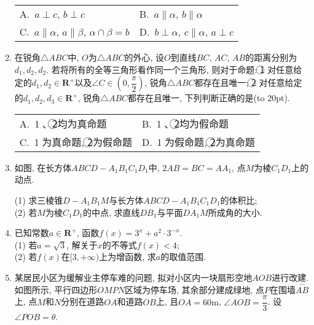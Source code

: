 \documentclass[10pt,a4paper]{article}
\newcommand{\bracket}[1]{(\hbox to #1pt{})}
\newcommand{\twoch}[4]{\par\begin{tabular}{p{.46\textwidth}p{.46\textwidth}}
A.~#1& B.~#2\\
C.~#3& D.~#4
\end{tabular}}
\begin{document}
\begin{enumerate}[1.]
\twoch{$a\perp c$, $b\perp c$}{$a\parallel \alpha$, $b\parallel \alpha$}{$a\parallel \alpha$, $a\parallel \beta$, $\alpha\cap \beta = b$}{$b\perp \alpha$, $c\parallel \alpha$, $a\perp c$}
\item 在锐角$\triangle ABC$中, $O$为$\triangle ABC$的外心, 设$O$到直线$BC$, $AC$, $AB$的距离分别为$d_1,d_2,d_2$. 若将所有的全等三角形看作同一个三角形, 则对于命题: \textcircled{1} 对任意给定的$d_1,d_2\in \mathbf{R}^+$以及$\angle C\in (0,\dfrac\pi 2)$, 锐角$\triangle ABC$都存在且唯一; \textcircled{2} 对任意给定的$d_1,d_2,d_3\in \mathbf{R}^+$, 锐角$\triangle ABC$都存在且唯一, 下列判断正确的是\bracket{20}.
\twoch{\textcircled{1}、\textcircled{2}均为真命题}{\textcircled{1}、\textcircled{2}均为假命题}{\textcircled{1}为真命题, \textcircled{2}为假命题}{\textcircled{1}为假命题, \textcircled{2}为真命题}
\item 如图, 在长方体$ABCD-A_1B_1C_1D_1$中, $2AB=BC=AA_1$, 点$M$为棱$C_1D_1$上的动点.
\begin{center}
\end{center}
(1) 求三棱锥$D-A_1B_1M$与长方体$ABCD-A_1B_1C_1D_1$的体积比;\\
(2) 若$M$为棱$C_1D_1$的中点, 求直线$DB_1$与平面$DA_1M$所成角的大小.
\item 已知常数$a\in \mathbf{R}^+$, 函数$f(x)=3^x+a^2\cdot 3^{-x}$.\\
(1) 若$a=\sqrt{3}$, 解关于$x$的不等式$f(x)<4$;\\
(2) 若$f(x)$在$[3,+\infty)$上为增函数, 求$a$的取值范围.
\item 某居民小区为缓解业主停车难的问题, 拟对小区内一块扇形空地$AOB$进行改建. 如图所示, 平行四边形$OMPN$区域为停车场, 其余部分建成绿地, 点$P$在围墙$\overset\frown{AB}$上, 点$M$和$N$分别在道路$OA$和道路$OB$上, 且$OA=60\text{m}$, $\angle AOB=\dfrac\pi 3$. 设$\angle POB=\theta$.

\end{enumerate}
\end{document}
